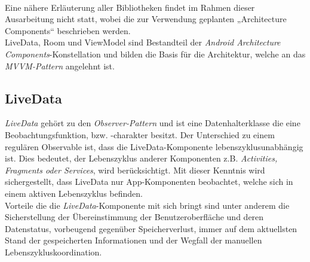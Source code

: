 \\
Eine nähere Erläuterung aller Bibliotheken findet im Rahmen dieser Ausarbeitung nicht statt, wobei die zur Verwendung geplanten 
„Architecture Components“ beschrieben werden. 
\\ 
\linebreak
LiveData, Room und ViewModel sind Bestandteil der \textit{Android Architecture Components}-Konstellation 
und bilden die Basis für die Architektur, welche an das \textit{MVVM-Pattern} angelehnt ist.

\subsection*{LiveData}
\label{sec:LiveData}
\textit{LiveData} gehört zu den \textit{Observer-Pattern} und ist eine Datenhalterklasse die eine Beobachtungsfunktion, bzw. -charakter besitzt. Der 
Unterschied zu einem regulären Observable ist, dass die LiveData-Komponente lebenszyklusunabhängig ist. Dies bedeutet, der Lebenszyklus anderer 
Komponenten z.B. \textit{Activities, Fragments oder Services}, wird berücksichtigt. Mit dieser Kenntnis wird sichergestellt, dass LiveData 
nur App-Komponenten beobachtet, welche sich in einem aktiven Lebenszyklus befinden.
\\ 
\linebreak
Vorteile die die \textit{LiveData}-Komponente mit sich bringt sind unter anderem die Sicherstellung der Übereinstimmung der Benutzeroberfläche und 
deren Datenstatus, vorbeugend gegenüber Speicherverlust, immer auf dem aktuellsten Stand der gespeicherten Informationen und der Wegfall 
der manuellen Lebenszykluskoordination. \cite{livedata.2020}
